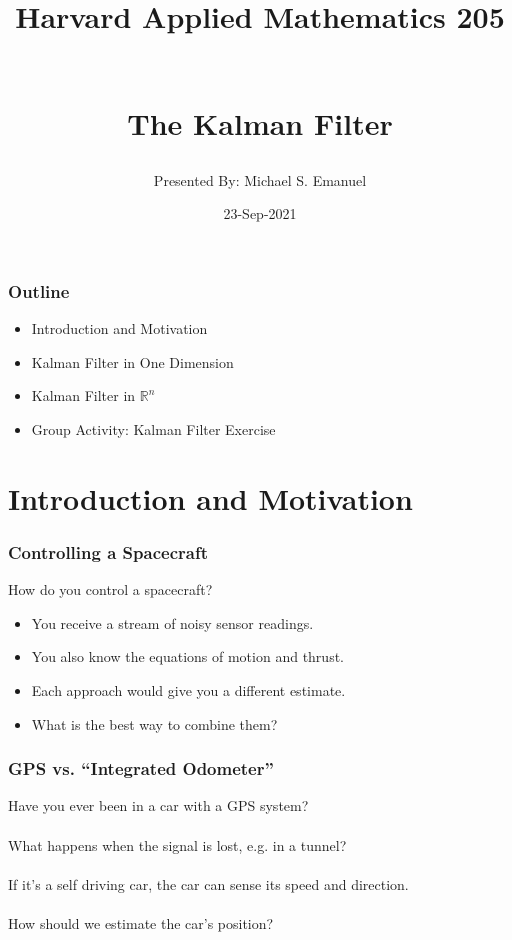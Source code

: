 \documentclass{beamer}
\newcommand{\R}{\mathbb{R}}
\begin{document}
\setlength{\abovedisplayskip}{6pt}
\setlength{\belowdisplayskip}{6pt}

\begin{frame}
  \title{Harvard Applied Mathematics 205\\\strut\\The Kalman Filter}
  \author{Presented By: Michael S. Emanuel}
  \date{23-Sep-2021}
  \maketitle
\end{frame}

\begin{frame}
\frametitle{Outline}
\begin{itemize}
\item Introduction and Motivation
\item Kalman Filter in One Dimension
\item Kalman Filter in $\R^n$
\item Group Activity: Kalman Filter Exercise
\end{itemize}
\end{frame}

\section{Introduction and Motivation}
\begin{frame}
\frametitle{Controlling a Spacecraft}
How do you control a spacecraft?
\begin{itemize}
\item You receive a stream of noisy sensor readings.
\item You also know the equations of motion and thrust.
\item Each approach would give you a different estimate.
\item  What is the best way to combine them?
\end{itemize}
\end{frame}

\begin{frame}
\frametitle{GPS vs. ``Integrated Odometer''}
Have you ever been in a car with a GPS system? \\~\\
What happens when the signal is lost, e.g. in a tunnel? \\~\\
If it's a self driving car, the car can sense its speed and direction. \\~\\
How should we estimate the car's position?
\end{frame}
\end{document}
